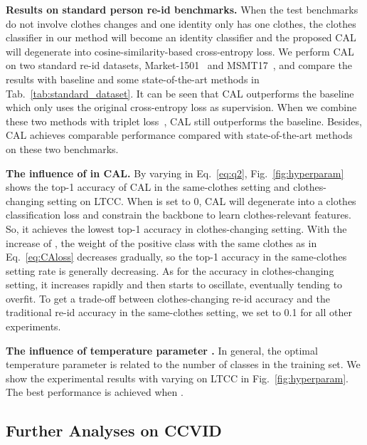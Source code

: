 \documentclass[10pt,twocolumn,letterpaper]{article}
\begin{document}
\medskip
\noindent
\textbf{Results on standard person re-id benchmarks.}
When the test benchmarks do not involve clothes changes and one identity only has one clothes, the clothes classifier in our method will become an identity classifier and the proposed CAL will degenerate into cosine-similarity-based cross-entropy loss. 
We perform CAL on two standard re-id datasets, \ie Market-1501~\cite{Zheng2015Scalable} and MSMT17~\cite{MSMT17}, and compare the results with baseline and some state-of-the-art methods in Tab.~\ref{tab:standard_dataset}. 
It can be seen that CAL outperforms the baseline which only uses the original cross-entropy loss as supervision. 
When we combine these two methods with triplet loss~\cite{Hermans2017In}, CAL still outperforms the baseline.
Besides, CAL achieves comparable performance compared with state-of-the-art methods on these two benchmarks.


\medskip
\noindent
\textbf{The influence of  in CAL.}
By varying  in Eq.~\eqref{eq:q2}, Fig.~\ref{fig:hyperparam} shows the top-1 accuracy of CAL in the same-clothes setting and clothes-changing setting on LTCC.
When  is set to 0, CAL will degenerate into a clothes classification loss and constrain the backbone to learn clothes-relevant features.
So, it achieves the lowest top-1 accuracy in clothes-changing setting.
With the increase of , the weight of the positive class with the same clothes as  in Eq.~\eqref{eq:CAloss} decreases gradually, so the top-1 accuracy in the same-clothes setting rate is generally decreasing.
As for the accuracy in clothes-changing setting, it increases rapidly and then starts to oscillate, eventually tending to overfit.
To get a trade-off between clothes-changing re-id accuracy and the traditional re-id accuracy in the same-clothes setting, we set  to 0.1 for all other experiments.

\medskip
\noindent
\textbf{The influence of temperature parameter .}
In general, the optimal temperature parameter  is related to the number of classes in the training set.
We show the experimental results with varying  on LTCC in Fig.~\ref{fig:hyperparam}.
The best performance is achieved when .



\subsection{Further Analyses on CCVID}
\label{sec:exp_on_ccvid}
\end{document}
